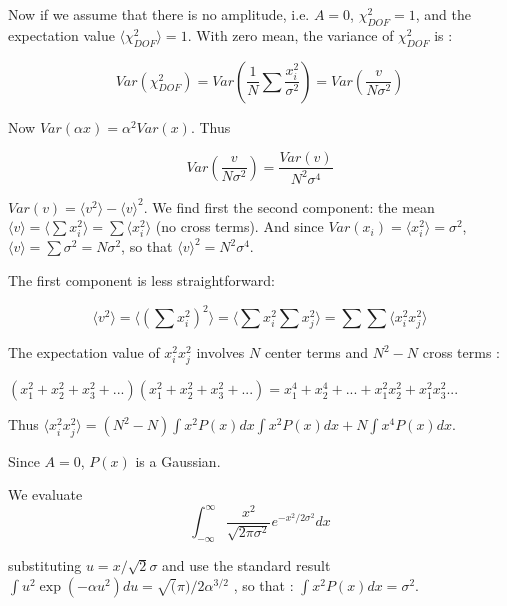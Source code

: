 \documentclass[fleqn,usenatbib]{mnras}  %
\begin{document}
Now if we assume that there is no amplitude, i.e. $A=0$, $\chi^{2}_{DOF} = 1$, and the expectation value $\langle \chi^{2}_{DOF} \rangle = 1$. With zero mean, the variance of $\chi^{2}_{DOF}$ is :

\begin{equation}
Var(\chi^{2}_{DOF}) = Var\left(\frac{1}{N} \sum \frac{x_{i}^{2}}{\sigma^{2}} \right) = Var\left(\frac{v}{N \sigma^{2}}\right)
\end{equation}

Now $Var(\alpha x) = \alpha^{2} Var(x)$. Thus 

\begin{equation} 
Var\left(\frac{v}{N \sigma^{2}}\right) = \frac{Var(v)}{N^{2} \sigma^{4}} 
\end{equation}

$Var(v) = \langle v^{2} \rangle - \langle v \rangle ^{2}$. We find first the second component:  the mean $\langle v \rangle = \langle \sum x_{i}^{2} \rangle = \sum \langle x_{i}^{2} \rangle $ (no cross terms). And since $Var(x_{i}) = \langle x_{i}^{2} \rangle= \sigma^{2}$, $\langle v \rangle = \sum \sigma^{2} = N \sigma^{2}$, so that $\langle v \rangle ^{2} = N^{2} \sigma^{4}$. 

The first component is less straightforward: 

\begin{equation}
\langle v^{2} \rangle  = \langle (\sum x_{i}^{2} ) ^{2} \rangle  =  \langle \sum x_{i}^{2}  \sum x_{j}^{2}   \rangle = \sum \sum \langle x_{i}^{2} x_{j}^{2} \rangle
\end{equation}

The expectation value of $x_{i}^{2} x_{j}^{2}$ involves $N$ center terms and $N^{2}-N$ cross terms : 

$(x_{1}^{2} + x_{2}^{2} +x_{3}^{2} +...)(x_{1}^{2} + x_{2}^{2} +x_{3}^{2} +...)= x_{1}^{4} + x_{2}^{4}+...+x_{1}^{2}x_{2}^{2} + x_{1}^{2}x_{3}^{2}...$

Thus $\langle x_{i}^{2} x_{j}^{2} \rangle = (N^{2}-N) \int x^{2} P(x) dx \int x^{2} P(x) dx  + N \int x^{4} P(x) dx  $. 

Since $A=0$, $P(x)$ is a Gaussian. 

We evaluate 
\begin{equation}
\int_{-\infty}^{\infty} \frac{x^{2}}{\sqrt{2\pi \sigma^{2}}} e^{-x^{2} / 2 \sigma^{2}} dx 
\end{equation}

substituting $u = x / \sqrt{2} \sigma$ and use the standard result  $\int u^{2} \exp(-\alpha u^{2})du = \sqrt(\pi)/2\alpha^{3/2}$ , so that :   $\int x^{2} P(x) dx = \sigma^{2}$. 
\end{document}
